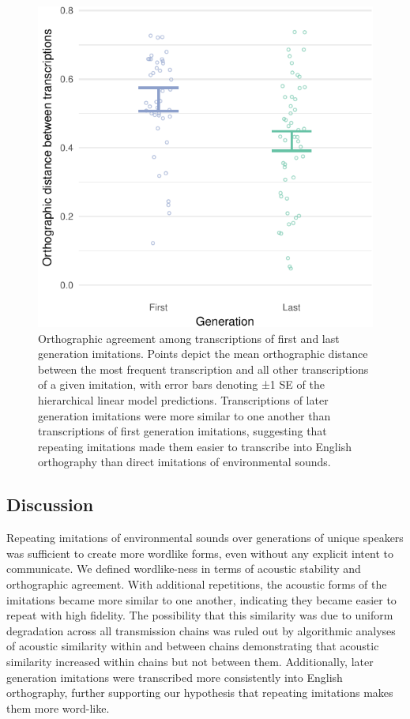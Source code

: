 \documentclass[english,floatsintext,man]{apa6}
\theoremstyle{definition}
\theoremstyle{definition}
\theoremstyle{definition}
\theoremstyle{remark}
\begin{document}
\begin{figure}
\centering
\includegraphics{fig3-1.pdf}
\caption{\label{fig:fig3}Orthographic agreement among transcriptions of
first and last generation imitations. Points depict the mean
orthographic distance between the most frequent transcription and all
other transcriptions of a given imitation, with error bars denoting ±1
SE of the hierarchical linear model predictions. Transcriptions of later
generation imitations were more similar to one another than
transcriptions of first generation imitations, suggesting that repeating
imitations made them easier to transcribe into English orthography than
direct imitations of environmental sounds.}
\end{figure}

\hypertarget{discussion}{%
\subsection{Discussion}\label{discussion}}

Repeating imitations of environmental sounds over generations of unique
speakers was sufficient to create more wordlike forms, even without any
explicit intent to communicate. We defined wordlike-ness in terms of
acoustic stability and orthographic agreement. With additional
repetitions, the acoustic forms of the imitations became more similar to
one another, indicating they became easier to repeat with high fidelity.
The possibility that this similarity was due to uniform degradation
across all transmission chains was ruled out by algorithmic analyses of
acoustic similarity within and between chains demonstrating that
acoustic similarity increased within chains but not between them.
Additionally, later generation imitations were transcribed more
consistently into English orthography, further supporting our hypothesis
that repeating imitations makes them more word-like.
\end{document}
